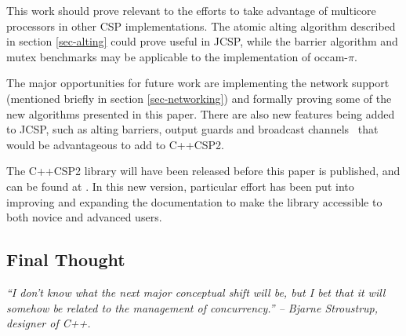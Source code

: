 \documentclass[12pt]{IOS-Book-Article-CPA-2007}
\newcommand{\occampi}{occam-$\pi$}
\begin{document}
This work should prove relevant to the efforts to take advantage of multicore processors in other CSP implementations.  The atomic alting algorithm 
described in section \ref{sec-alting} could prove useful in JCSP, while the barrier algorithm and mutex benchmarks may be applicable to the 
implementation of \occampi.

The major opportunities for future work are implementing the network support (mentioned briefly in section \ref{sec-networking}) and 
formally proving some of the new algorithms presented in this paper.  There are also new features being added to JCSP, such as alting barriers, 
output guards and broadcast channels \cite{welch-jcsp-2007}~that would be advantageous to add to C++CSP2.

The C++CSP2 library will have been released before this paper is published, and can be found at \cite{web-c++csp2}.  In this new version, particular 
effort has been put into improving and expanding the documentation to make the library accessible to both novice and advanced users.

\subsection{Final Thought}

\textit{``I don't know what the next major conceptual shift will be, but I bet that it will somehow be related to the management of concurrency.'' -- 
Bjarne Stroustrup, designer of C++.}

{\small
    
    
}
\end{document}
